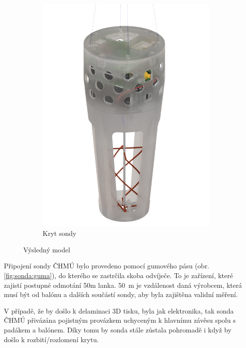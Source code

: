 \documentclass[twoside]{ctuthesis}
\theoremstyle{plain}
\theoremstyle{definition}
\theoremstyle{note}
\begin{document}
\begin{figure}[hbtp]
\begin{subfigure}{.49\textwidth}
			\includegraphics[width = .85\textwidth]{Figures/sonda_case.png}
			\caption{Kryt sondy}
			\label{fig:sondacase}
		\end{subfigure}
		\caption{Výsledný model}
		\label{fig:sonda:final}
	\end{figure}


	Připojení sondy ČHMÚ bylo provedeno pomocí gumového pásu (obr. \ref{fig:sonda:guma}), do kterého se zastrčila skoba odvíječe. To je zařízení, které zajistí postupné odmotání 50m lanka. 50~m je vzdálenost daná výrobcem, která musí být od balónu a dalších součástí sondy, aby byla zajištěna validní měření.

	

	V případě, že by došlo k delaminaci 3D tisku, byla jak elektronika, tak sonda ČHMÚ přivázána pojistným provázkem uchyceným k hlavnímu závěsu spolu s padákem a balónem. Díky tomu by sonda stále zůstala pohromadě i když by došlo k rozbití/rozlomení krytu.

\end{document}
